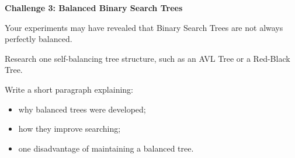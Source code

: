 \documentclass{csc2059practical}
\begin{document}
\begin{challengebox}
\textbf{Challenge 3: Balanced Binary Search Trees}

Your experiments may have revealed that Binary Search Trees are not always
perfectly balanced.

Research one self-balancing tree structure, such as an AVL Tree or a
Red-Black Tree.

Write a short paragraph explaining:

\begin{itemize}
    \item why balanced trees were developed;
    \item how they improve searching;
    \item one disadvantage of maintaining a balanced tree.
\end{itemize}
\end{challengebox}
\end{document}
